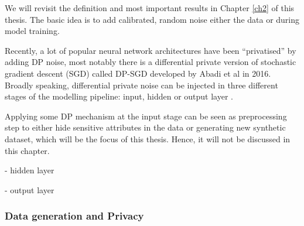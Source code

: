 We will revisit the definition and most important results in Chapter \ref{ch2} of this thesis. The basic idea is to add calibrated, random noise either the data or during model training.

Recently, a lot of popular neural network architectures have been ``privatised'' by adding DP noise, most notably there is a differential private version of stochastic gradient descent (SGD) called DP-SGD developed by Abadi et al \parencite{Abadi_2016} in 2016. Broadly speaking, differential private noise can be injected in three different stages of the modelling pipeline: input, hidden or output layer \parencite[cf.][]{zhao2019differential}. 

Applying some DP mechanism at the input stage can be seen as preprocessing step to either hide sensitive attributes in the data or generating new synthetic dataset, which will be the focus of this thesis. Hence, it will not be discussed in this chapter. 

- hidden layer

- output layer


\subsubsection*{Data generation and Privacy}